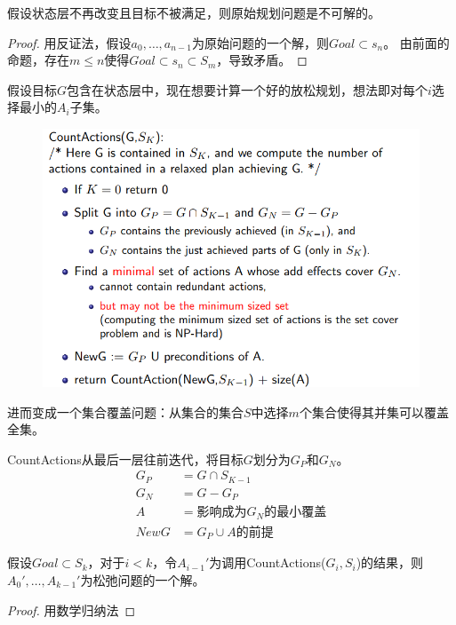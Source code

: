 \begin{theorem}
假设状态层不再改变且目标不被满足，则原始规划问题是不可解的。
\end{theorem}
\begin{proof}
用反证法，假设$a_0,\ldots,a_{n-1}$为原始问题的一个解，则$Goal\subset s_n$。
由前面的命题，存在$m\leq n$使得$Goal\subset s_n\subset S_m$，导致矛盾。
\end{proof}

假设目标$G$包含在状态层中，现在想要计算一个好的放松规划，想法即对每个$i$选择最小的$A_i$子集。
\begin{figure}[H]
\centering
\includegraphics[width=0.8\linewidth]{fig/count_actions.png}
\end{figure}
进而变成一个集合覆盖问题：从集合的集合$S$中选择$m$个集合使得其并集可以覆盖全集。

CountActions从最后一层往前迭代，将目标$G$划分为$G_P$和$G_N$。
\[\begin{aligned}
G_P&=G\cap S_{K-1}\\
G_N&=G-G_P\\
A&=\text{影响成为}G_N\text{的最小覆盖}\\
NewG&=G_P\cup A\text{的前提}
\end{aligned}\]

\begin{theorem}
假设$Goal\subset S_k$，对于$i<k$，令$A_{i-1}'$为调用CountActions($G_i,S_i$)的结果，则$A_0',\ldots,A_{k-1}'$为松弛问题的一个解。
\end{theorem}
\begin{proof}
用数学归纳法
\end{proof}